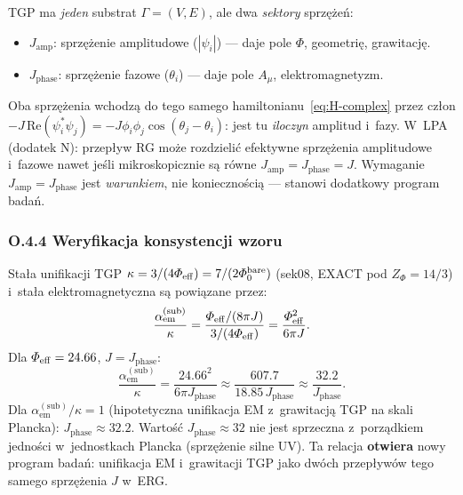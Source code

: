 \begin{uwaga}
TGP ma \emph{jeden} substrat $\Gamma = (V, E)$, ale dwa
\emph{sektory} sprzężeń:
\begin{itemize}
  \item $J_\mathrm{amp}$: sprzężenie amplitudowe ($|\psi_i|$) ---
        daje pole $\Phi$, geometrię, grawitację.
  \item $J_\mathrm{phase}$: sprzężenie fazowe ($\theta_i$) ---
        daje pole $A_\mu$, elektromagnetyzm.
\end{itemize}
Oba sprzężenia wchodzą do tego samego hamiltonianu~\eqref{eq:H-complex}
przez człon $-J\,\mathrm{Re}(\psi_i^*\psi_j) = -J\phi_i\phi_j\cos(\theta_j-\theta_i)$:
jest tu \emph{iloczyn} amplitud i~fazy. W~LPA (dodatek N):
przepływ RG może rozdzielić efektywne sprzężenia amplitudowe
i~fazowe nawet jeśli mikroskopicznie są równe $J_\mathrm{amp} = J_\mathrm{phase} = J$.
Wymaganie $J_\mathrm{amp} = J_\mathrm{phase}$ jest \emph{warunkiem},
nie koniecznością --- stanowi dodatkowy program badań.
\end{uwaga}

\subsubsection*{O.4.4 Weryfikacja konsystencji wzoru}

\begin{propozycja}
\label{prop:alpha_kappa}
Stała unifikacji TGP $\kappa = 3/(4\Phi_{\rm eff}) = 7/(2\Phi_0^{\rm bare})$
(sek08, EXACT pod $Z_\Phi = 14/3$) i~stała elektromagnetyczna są powiązane przez:
\begin{equation}
  \frac{\alpha_\mathrm{em}^\mathrm{(sub)}}{\kappa}
  = \frac{\Phi_{\rm eff}/(8\pi J)}{3/(4\Phi_{\rm eff})}
  = \frac{\Phi_{\rm eff}^2}{6\pi J}.
  \label{eq:alpha_kappa_ratio}
\end{equation}
Dla $\Phi_{\rm eff} = 24.66$, $J = J_\mathrm{phase}$:
\begin{equation}
  \frac{\alpha_\mathrm{em}^\mathrm{(sub)}}{\kappa}
  = \frac{24.66^2}{6\pi J_\mathrm{phase}}
  \approx \frac{607.7}{18.85\,J_\mathrm{phase}}
  \approx \frac{32.2}{J_\mathrm{phase}}.
\end{equation}
Dla $\alpha_\mathrm{em}^\mathrm{(sub)}/\kappa = 1$ (hipotetyczna unifikacja
EM z~grawitacją TGP na skali Plancka): $J_\mathrm{phase} \approx 32.2$.
Wartość $J_\mathrm{phase} \approx 32$ nie jest sprzeczna z~porządkiem
jedności w~jednostkach Plancka (sprzężenie silne UV).
Ta relacja \textbf{otwiera} nowy program badań: unifikacja EM
i~grawitacji TGP jako dwóch przepływów tego samego sprzężenia $J$
w~ERG.
\end{propozycja}

